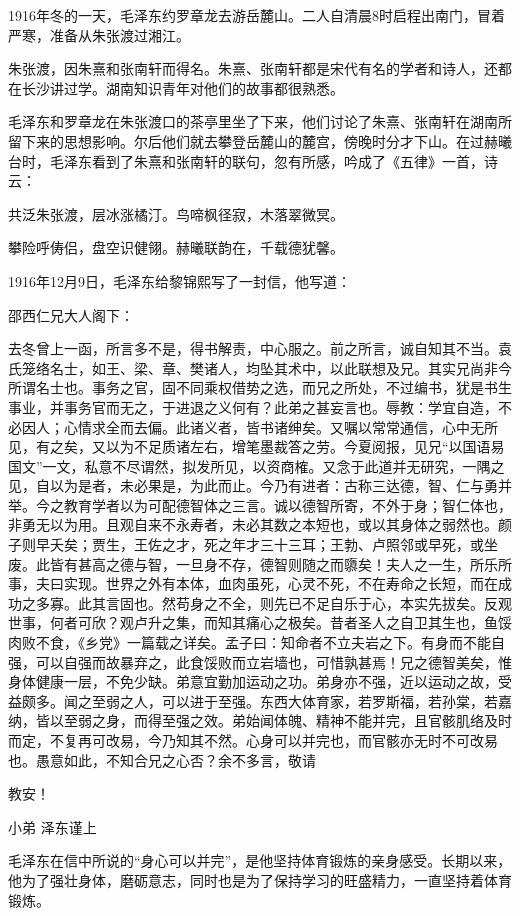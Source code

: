 \documentclass[../../dazhuan.tex]{subfiles}
\begin{document}
1916年冬的一天，毛泽东约罗章龙去游岳麓山。二人自清晨8时启程出南门，冒着严寒，准备从朱张渡过湘江。

朱张渡，因朱熹和张南轩而得名。朱熹、张南轩都是宋代有名的学者和诗人，还都在长沙讲过学。湖南知识青年对他们的故事都很熟悉。

毛泽东和罗章龙在朱张渡口的茶亭里坐了下来，他们讨论了朱熹、张南轩在湖南所留下来的思想影响。尔后他们就去攀登岳麓山的麓宫，傍晚时分才下山。在过赫曦台时，毛泽东看到了朱熹和张南轩的联句，忽有所感，吟成了《五律》一首，诗云：
\begin{poem}
共泛朱张渡，层冰涨橘汀。鸟啼枫径寂，木落翠微冥。

攀险呼俦侣，盘空识健翎。赫曦联韵在，千载德犹馨。
\end{poem}

1916年12月9日，毛泽东给黎锦熙写了一封信，他写道：
\begin{xquote}
邵西仁兄大人阁下：

去冬曾上一函，所言多不是，得书解责，中心服之。前之所言，诚自知其不当。袁氏笼络名士，如王、梁、章、樊诸人，均坠其术中，以此联想及兄。其实兄尚非今所谓名士也。事务之官，固不同乘权借势之选，而兄之所处，不过编书，犹是书生事业，并事务官而无之，于进退之义何有？此弟之甚妄言也。辱教：学宜自造，不必因人；心情求全而去偏。此诸义者，皆书诸绅矣。又嘱以常常通信，心中无所见，有之矣，又以为不足质诸左右，增笔墨裁答之劳。今夏阅报，见兄“以国语易国文”一文，私意不尽谓然，拟发所见，以资商榷。又念于此道并无研究，一隅之见，自以为是者，未必果是，为此而止。今乃有进者：古称三达德，智、仁与勇并举。今之教育学者以为可配德智体之三言。诚以德智所寄，不外于身；智仁体也，非勇无以为用。且观自来不永寿者，未必其数之本短也，或以其身体之弱然也。颜子则早夭矣；贾生，王佐之才，死之年才三十三耳；王勃、卢照邻或早死，或坐废。此皆有甚高之德与智，一旦身不存，德智则随之而隳矣！夫人之一生，所乐所事，夫曰实现。世界之外有本体，血肉虽死，心灵不死，不在寿命之长短，而在成功之多寡。此其言固也。然苟身之不全，则先已不足自乐于心，本实先拔矣。反观世事，何者可欣？观卢升之集，而知其痛心之极矣。昔者圣人之自卫其生也，鱼馁肉败不食，《乡党》一篇载之详矣。孟子曰：知命者不立夫岩之下。有身而不能自强，可以自强而故暴弃之，此食馁败而立岩墙也，可惜孰甚焉！兄之德智美矣，惟身体健康一层，不免少缺。弟意宜勤加运动之功。弟身亦不强，近以运动之故，受益颇多。闻之至弱之人，可以进于至强。东西大体育家，若罗斯福，若孙棠，若嘉纳，皆以至弱之身，而得至强之效。弟始闻体魄、精神不能并完，且官骸肌络及时而定，不复再可改易，今乃知其不然。心身可以并完也，而官骸亦无时不可改易也。愚意如此，不知合兄之心否？余不多言，敬请

教安！

\begin{sign}小弟 泽东谨上\end{sign}
\end{xquote}
毛泽东在信中所说的“身心可以并完”，是他坚持体育锻炼的亲身感受。长期以来，他为了强壮身体，磨砺意志，同时也是为了保持学习的旺盛精力，一直坚持着体育锻炼。
\end{document}
